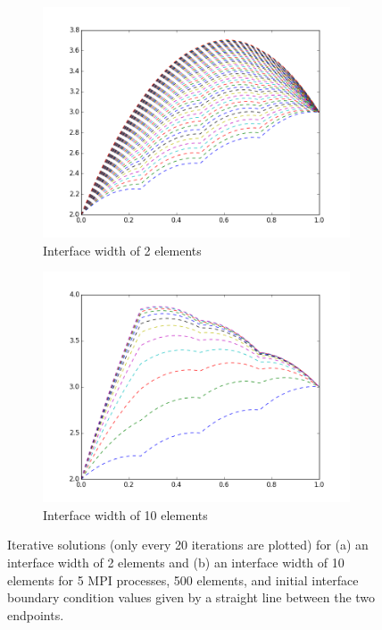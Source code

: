 \documentclass[10pt]{article}
\begin{document}
\begin{figure}[H]
        \centering
        \begin{subfigure}[b]{0.5\textwidth}
                \centering
                \includegraphics[width=\textwidth]{../figures/interface1.png}
                \caption{Interface width of 2 elements}
        \end{subfigure}%
                \begin{subfigure}[b]{0.5\textwidth}
                \centering
                \includegraphics[width=\textwidth]{../figures/interface2.png}
                \caption{Interface width of 10 elements}
        \end{subfigure}%
        \caption{Iterative solutions (only every 20 iterations are plotted) for (a) an interface width of 2 elements and (b) an interface width of 10 elements for 5 MPI processes, 500 elements, and initial interface boundary condition values given by a straight line between the two endpoints.}
\label{fig:interface}
\end{figure}
\end{document}
